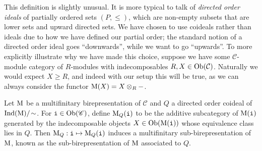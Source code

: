 \noindent\begin{remark} This definition is slightly unusual. It is more typical to talk of {\em directed order ideals} of partially ordered sets $(P, \leq)$, which are non-empty subsets that are lower sets and upward directed sets. We have chosen to use coideals rather than ideals due to how we have defined our partial order; the standard notion of a directed order ideal goes ``downwards'', while we want to go ``upwards''. To more explicitly illustrate why we have made this choice, suppose we have some $\mathcal{C}$-module category of $R$-modules with indecomposables $R, X \in \textnormal{Ob}(\mathcal{C})$. Naturally we would expect $X \geq R$, and indeed with our setup this will be true, as we can always consider the functor $\textnormal{M}(X) = X \otimes_R -$.\\
\end{remark}


\noindent Let $\textnormal{M}$ be a multifinitary birepresentation of $\mathscr{C}$ and $Q$ a directed order coideal of $\textnormal{Ind}(\textnormal{M})/\!\sim$. For $\textnormal{\texttt{i}} \in \textnormal{Ob}(\mathscr{C})$, define $\textnormal{M}_Q(\textnormal{\texttt{i}})$ to be the additive subcategory of $\textnormal{M}(\textnormal{\texttt{i}})$ generated by the indecomposable objects $X \in \textnormal{Ob}(\textnormal{M}(\textnormal{\texttt{i}}))$ whose equivalence class lies in $Q$. Then $\textnormal{M}_Q : \textnormal{\texttt{i}} \mapsto \textnormal{M}_Q(\textnormal{\texttt{i}})$ induces a multifinitary sub-birepresentation of $\textnormal{M}$, known as the sub-birepresentation of $\textnormal{M}$ associated to $Q$.\\

